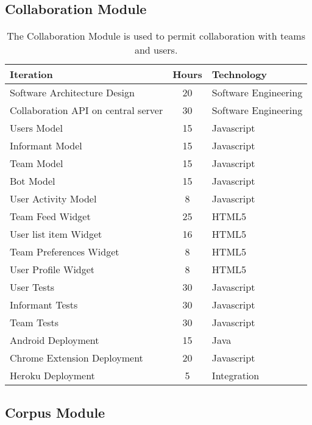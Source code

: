\documentclass[12 pt]{article}
\begin{document}
\newpage

\subsection{Collaboration Module}

\footnotesize
\begin{table}[htbp]
\begin{center}
  \begin{tabular}{ | lcl | }
\hline
Iteration&	Hours&	Technology	\\
\hline
Software Architecture Design&	20&	Software Engineering	\\ 
Collaboration API on central server&	30&	Software Engineering\\ 
Users Model&	15&	Javascript	\\ 
Informant Model&	15&	Javascript	\\ 
Team Model&	15&	Javascript	\\ 
Bot Model&	15&	Javascript	\\ 
User Activity Model&	8&	Javascript	\\ 
Team Feed Widget&	25&	HTML5	\\ 
User list item Widget&	16&	HTML5	\\ 
Team Preferences Widget&	8&	HTML5	\\ 
User Profile Widget&	8&	HTML5	\\ 
User Tests&	30&	Javascript \\ 
Informant Tests&	30&	Javascript	\\ 
Team Tests&	30&	Javascript	\\ 
Android Deployment&	15&	Java	\\ 
Chrome Extension Deployment&	20&	Javascript \\ 
Heroku Deployment&	5&	Integration	\\ 
\hline
  \end{tabular}
  \caption{The Collaboration Module is used to permit collaboration with teams and users. }
  \label{tab:label}
  \end{center}
\end{table}



\subsection{Corpus Module}
\end{document}
